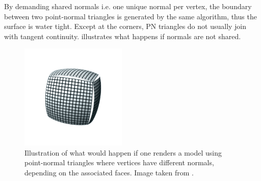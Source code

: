 By demanding shared normals i.e. one unique normal per vertex, the boundary between two point-normal triangles is generated by the same algorithm, thus the surface is water tight. Except at the corners, PN triangles do not usually join with tangent continuity.  illustrates what happens if normals are not shared.

\begin{figure}
	\centering
	\includegraphics[width=0.45\textwidth]{./content/img/method/cracks.png}
	\caption{Illustration of what would happen if one renders a model using point-normal triangles where vertices have different normals, depending on the associated faces. Image taken from \cite{mcdonald2010crack}.}
	\label{fig:method:cracks}
\end{figure}